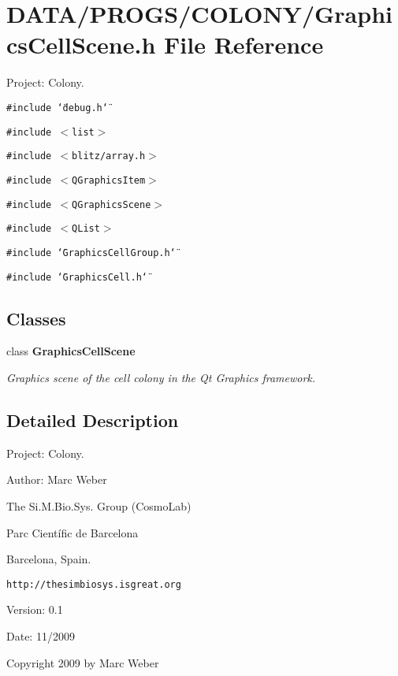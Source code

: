 \section{DATA/PROGS/COLONY/GraphicsCellScene.h File Reference}
\label{GraphicsCellScene_8h}
Project: Colony. 

{\tt \#include \char`\"{}debug.h\char`\"{}}\par
{\tt \#include $<$list$>$}\par
{\tt \#include $<$blitz/array.h$>$}\par
{\tt \#include $<$QGraphicsItem$>$}\par
{\tt \#include $<$QGraphicsScene$>$}\par
{\tt \#include $<$QList$>$}\par
{\tt \#include \char`\"{}GraphicsCellGroup.h\char`\"{}}\par
{\tt \#include \char`\"{}GraphicsCell.h\char`\"{}}\par
\subsection*{Classes}
\begin{CompactItemize}
\item 
class {\bf GraphicsCellScene}
\begin{CompactList}\small\item\em Graphics scene of the cell colony in the Qt Graphics framework. \item\end{CompactList}\end{CompactItemize}


\subsection{Detailed Description}
Project: Colony. 

\begin{Desc}
\item[Author:]Marc Weber\par
 The Si.M.Bio.Sys. Group (CosmoLab)\par
 Parc Científic de Barcelona\par
 Barcelona, Spain.\par
 {\tt http://thesimbiosys.isgreat.org} \end{Desc}
\begin{Desc}
\item[Version:]0.1 \end{Desc}
\begin{Desc}
\item[Date:]11/2009\end{Desc}
Copyright 2009 by Marc Weber 